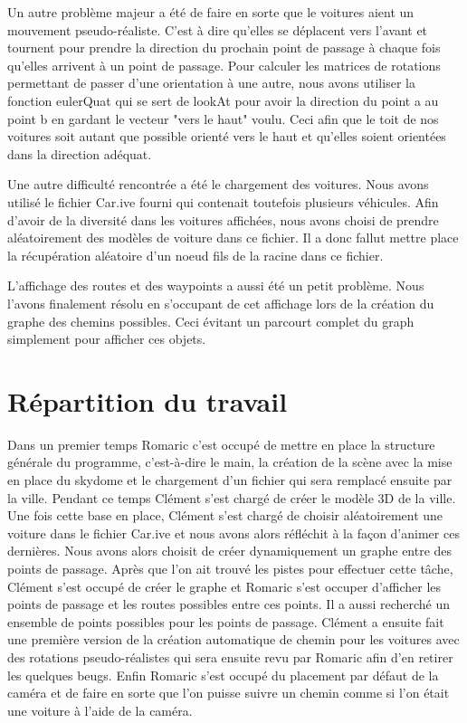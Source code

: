 \documentclass[a4paper, 11pt]{report}
\begin{document}
  Un autre problème majeur a été de faire en sorte que le voitures aient un mouvement pseudo-réaliste.
  C'est à dire qu'elles se déplacent vers l'avant et tournent pour prendre la direction du prochain point de 
  passage à chaque fois qu'elles arrivent à un point de passage. Pour calculer les matrices de rotations 
  permettant de passer d'une orientation à une autre, nous avons utiliser la fonction eulerQuat qui se sert 
  de lookAt pour avoir la direction du point a au point b en gardant le vecteur "vers le haut" voulu. Ceci afin
  que le toit de nos voitures soit autant que possible orienté vers le haut et qu'elles soient orientées dans
  la direction adéquat.

  Une autre difficulté rencontrée a été le chargement des voitures. Nous avons utilisé le fichier Car.ive
  fourni qui contenait toutefois plusieurs véhicules. Afin d'avoir de la diversité dans les voitures affichées,
  nous avons choisi de prendre aléatoirement des modèles de voiture dans ce fichier. Il a donc fallut mettre
  place la récupération aléatoire d'un noeud fils de la racine dans ce fichier.

  L'affichage des routes et des waypoints a aussi été un petit problème. Nous l'avons finalement résolu 
  en s'occupant de cet affichage lors de la création du graphe des chemins possibles. Ceci évitant un 
  parcourt complet du graph simplement pour afficher ces objets.
  
  \section*{Répartition du travail}
  Dans un premier temps Romaric c'est occupé de mettre en place la structure générale du programme,
  c'est-à-dire le main, la création de la scène avec la mise en place du skydome et le chargement d'un 
  fichier qui sera remplacé ensuite par la ville. Pendant ce temps Clément s'est chargé de créer le modèle
  3D de la ville. Une fois cette base en place, Clément s'est chargé de choisir aléatoirement une voiture dans
  le fichier Car.ive et nous avons alors réfléchit à la façon d'animer ces dernières. Nous avons alors choisit de
  créer dynamiquement un graphe entre des points de passage. Après que l'on ait trouvé les pistes pour
  effectuer cette tâche, Clément s'est occupé de créer le graphe et Romaric s'est occuper d'afficher les
  points de passage et les routes possibles entre ces points. Il a aussi recherché un ensemble de points 
  possibles pour les points de passage. Clément a ensuite fait une première version de la création 
  automatique de chemin pour les voitures avec des rotations pseudo-réalistes qui sera ensuite revu par
  Romaric afin d'en retirer les quelques beugs. Enfin Romaric s'est occupé du placement par défaut de la
  caméra et de faire en sorte que l'on puisse suivre un chemin comme si l'on était une voiture à l'aide de la 
  caméra.
\end{document}
